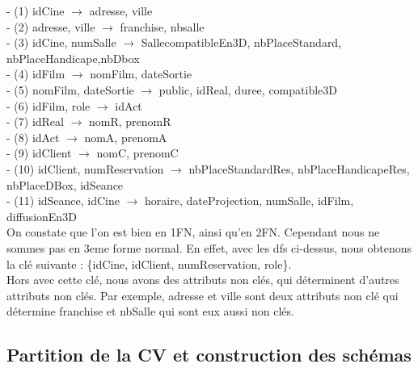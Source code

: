 \documentclass[a4paper,sffamily,12pt]{article}
\begin{document}
						\noindent- (1) idCine $\rightarrow$ adresse, ville \\
						- (2) adresse, ville $\rightarrow$ franchise, nbsalle \\
						- (3) idCine, numSalle $\rightarrow$ SallecompatibleEn3D, nbPlaceStandard, nbPlaceHandicape,nbDbox \\
				 		- (4) idFilm $\rightarrow$ nomFilm, dateSortie \\
						- (5) nomFilm, dateSortie $\rightarrow$ public, idReal, duree, compatible3D \\
						- (6) idFilm, role $\rightarrow$  idAct \\
						- (7) idReal $\rightarrow$ nomR, prenomR \\
						- (8) idAct $\rightarrow$ nomA, prenomA \\
						- (9) idClient $\rightarrow$ nomC, prenomC \\
						- (10) idClient, numReservation $\rightarrow$ nbPlaceStandardRes, nbPlaceHandicapeRes, nbPlaceDBox, idSeance \\
						- (11) idSeance, idCine $\rightarrow$ horaire, dateProjection, numSalle, idFilm, diffusionEn3D \\
															
						On constate que l'on est bien en 1FN, ainsi qu'en 2FN. Cependant nous ne sommes pas en 3eme forme normal. En effet, avec les dfs ci-dessus, nous obtenons la clé suivante : \{idCine, idClient, numReservation, role\}. \\
						Hors avec cette clé, nous avons des attributs non clés, qui déterminent d'autres attributs non clés. Par exemple, adresse et ville sont deux attributs non clé qui détermine franchise et nbSalle qui sont eux aussi non clés. \\
															
					\subsection{Partition de la CV et construction des schémas} 	
					
\end{document}
